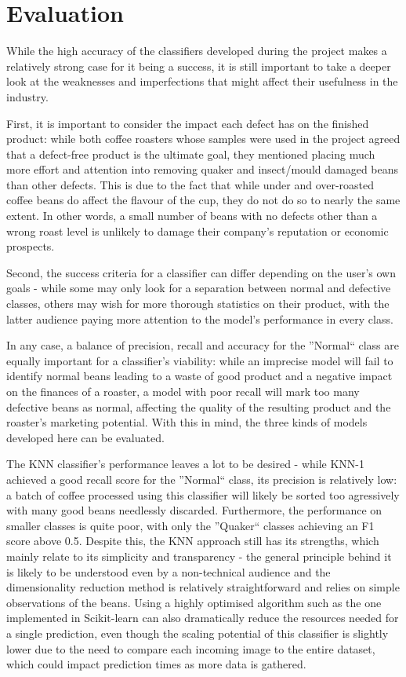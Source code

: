 \section{Evaluation}
\label{sec:evaluation}
While the high accuracy of the classifiers developed during the project makes a relatively strong case for it being a success,
it is still important to take a deeper look at the weaknesses and imperfections that might affect their usefulness in the industry.

First, it is important to consider the impact each defect has on the finished product: while both coffee roasters whose
samples were used in the project agreed that a defect-free product is the ultimate goal, they mentioned placing much more
effort and attention into removing quaker and insect/mould damaged beans than other defects.
This is due to the fact that while under and over-roasted coffee beans do affect the flavour of the cup, they do not
do so to nearly the same extent.
In other words, a small number of beans with no defects other than a wrong roast level is unlikely to damage their company's
reputation or economic prospects.

Second, the success criteria for a classifier can differ depending on the user's own goals - while some may only look for
a separation between normal and defective classes, others may wish for more thorough statistics on their product, with
the latter audience paying more attention to the model's performance in every class.

In any case, a balance of precision, recall and accuracy for the ''Normal`` class are equally
important for a classifier's viability: while an imprecise model will fail to identify normal beans leading to
a waste of good product and a negative impact on the finances of a roaster, a model with poor recall will mark too many
defective beans as normal, affecting the quality of the resulting product and the roaster's marketing potential.
With this in mind, the three kinds of models developed here can be evaluated.

The KNN classifier's performance leaves a lot to be desired - while KNN-1 achieved a good recall score for the ''Normal``
class, its precision is relatively low: a batch of coffee processed using this classifier will likely be sorted too agressively
with many good beans needlessly discarded.
Furthermore, the performance on smaller classes is quite poor, with only the ''Quaker`` classes achieving an F1 score above
0.5.
Despite this, the KNN approach still has its strengths, which mainly relate to its simplicity and transparency -
the general principle behind it is likely to be understood even by a non-technical audience and the dimensionality reduction
method is relatively straightforward and relies on simple observations of the beans.
Using a highly optimised algorithm such as the one implemented in Scikit-learn can also dramatically reduce the resources
needed for a single prediction, even though the scaling potential of this classifier is slightly lower due to the need to
compare each incoming image to the entire dataset, which could impact prediction times as more data is gathered.

